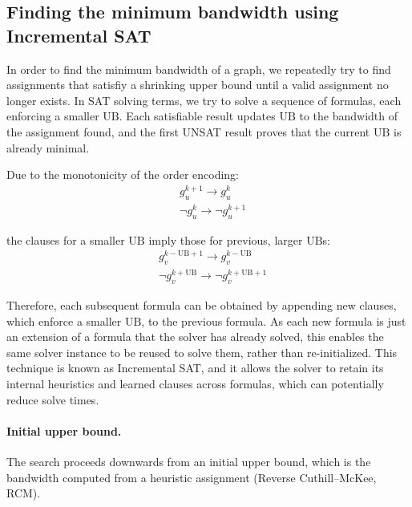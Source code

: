 \documentclass[a4paper,fleqn]{cas-sc}
\begin{document}
    \subsection{Finding the minimum bandwidth using Incremental SAT}
        In order to find the minimum bandwidth of a graph, we repeatedly try to find assignments that satisfiy a shrinking upper bound until a valid assignment no longer exists. In SAT solving terms, we try to solve a sequence of formulas, each enforcing a smaller $\text{UB}$. Each satisfiable result updates $\text{UB}$ to the bandwidth of the assignment found, and the first UNSAT result proves that the current $\text{UB}$ is already minimal.

        \vspace{1em}

        \noindent Due to the monotonicity of the order encoding:
        \begin{align}
            &g_u^{k+1} \rightarrow g_u^k \\
            &\neg g_u^k \rightarrow \neg g_u^{k+1}
        \end{align}
        
        \noindent the clauses for a smaller $\text{UB}$ imply those for previous, larger $\text{UB}$s:
        \begin{align}
            &g_v^{k-\text{UB}+1} \rightarrow g_v^{k-\text{UB}} \\
            &\neg g_v^{k+\text{UB}} \rightarrow \neg g_v^{k+\text{UB}+1}
        \end{align}
        
        Therefore, each subsequent formula can be obtained by appending new clauses, which enforce a smaller $\text{UB}$, to the previous formula. As each new formula is just an extension of a formula that the solver has already solved, this enables the same solver instance to be reused to solve them, rather than re-initialized. This technique is known as Incremental SAT, and it allows the solver to retain its internal heuristics and learned clauses across formulas, which can potentially reduce solve times.

        \paragraph{\textbf{Initial upper bound.}}
            The search proceeds downwards from an initial upper bound, which is the bandwidth computed from a heuristic assignment (Reverse Cuthill--McKee, RCM).
\end{document}
